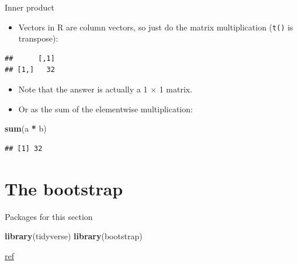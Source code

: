 \documentclass[
  ignorenonframetext,
]{beamer}
\newenvironment{Shaded}{\begin{snugshade}}{\end{snugshade}}
\newcommand{\DecValTok}[1]{\textcolor[rgb]{0.00,0.00,0.81}{#1}}
\newcommand{\KeywordTok}[1]{\textcolor[rgb]{0.13,0.29,0.53}{\textbf{#1}}}
\newcommand{\NormalTok}[1]{#1}
\newcommand{\OperatorTok}[1]{\textcolor[rgb]{0.81,0.36,0.00}{\textbf{#1}}}
\newcommand{\StringTok}[1]{\textcolor[rgb]{0.31,0.60,0.02}{#1}}
\providecommand{\tightlist}{%
  \setlength{\itemsep}{0pt}\setlength{\parskip}{0pt}}
\begin{document}
\begin{frame}[fragile]{Inner product}
\protect\hypertarget{inner-product}{}

\begin{itemize}
\tightlist
\item
  Vectors in R are column vectors, so just do the matrix multiplication
  (\texttt{t()} is transpose):
\end{itemize}

\begin{Shaded}
\end{Shaded}

\begin{verbatim}
##      [,1]
## [1,]   32
\end{verbatim}

\begin{itemize}
\tightlist
\item
  Note that the answer is actually a 1 × 1 matrix.
\item
  Or as the sum of the elementwise multiplication:
\end{itemize}

\begin{Shaded}
\begin{Highlighting}[]
\KeywordTok{sum}\NormalTok{(a }\OperatorTok{*}\StringTok{ }\NormalTok{b)}
\end{Highlighting}
\end{Shaded}

\begin{verbatim}
## [1] 32
\end{verbatim}

\end{frame}

\hypertarget{the-bootstrap}{%
\section{The bootstrap}\label{the-bootstrap}}

\begin{frame}[fragile]{Packages for this section}
\protect\hypertarget{packages-for-this-section-11}{}

\begin{Shaded}
\begin{Highlighting}[]
\KeywordTok{library}\NormalTok{(tidyverse)}
\KeywordTok{library}\NormalTok{(bootstrap)}
\end{Highlighting}
\end{Shaded}

\href{https://www.researchgate.net/publication/265399426_Bootstrap_Methods_and_Permutation_Tests}{ref}

\end{frame}
\end{document}
